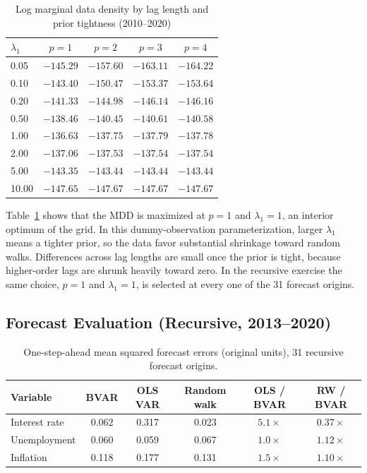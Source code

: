 \documentclass[11pt]{article}
\begin{document}
\begin{table}[H]
  \centering
  \caption{Log marginal data density by lag length and prior tightness (2010--2020)}
  \label{tab:mdd}
  \begin{tabular}{lcccc}
    \toprule
    $\lambda_1$ & $p=1$ & $p=2$ & $p=3$ & $p=4$ \\
    \midrule
    0.05 & $-145.29$ & $-157.60$ & $-163.11$ & $-164.22$ \\
    0.10 & $-143.40$ & $-150.47$ & $-153.37$ & $-153.64$ \\
    0.20 & $-141.33$ & $-144.98$ & $-146.14$ & $-146.16$ \\
    0.50 & $-138.46$ & $-140.45$ & $-140.61$ & $-140.58$ \\
    1.00 & $\mathbf{-136.63}$ & $-137.75$ & $-137.79$ & $-137.78$ \\
    2.00 & $-137.06$ & $-137.53$ & $-137.54$ & $-137.54$ \\
    5.00 & $-143.35$ & $-143.44$ & $-143.44$ & $-143.44$ \\
    10.00 & $-147.65$ & $-147.67$ & $-147.67$ & $-147.67$ \\
    \bottomrule
  \end{tabular}
\end{table}

Table~\ref{tab:mdd} shows that the MDD is maximized at $p = 1$ and $\lambda_1 = 1$, an interior optimum of the grid. In this dummy-observation parameterization, larger $\lambda_1$ means a tighter prior, so the data favor substantial shrinkage toward random walks. Differences across lag lengths are small once the prior is tight, because higher-order lags are shrunk heavily toward zero. In the recursive exercise the same choice, $p = 1$ and $\lambda_1 = 1$, is selected at every one of the 31 forecast origins.

\subsection{Forecast Evaluation (Recursive, 2013--2020)}

\begin{table}[H]
  \centering
  \caption{One-step-ahead mean squared forecast errors (original units), 31 recursive forecast origins.}
  \label{tab:forecast}
  \begin{tabular}{lccccc}
    \toprule
    Variable & BVAR & OLS VAR & Random walk & OLS / BVAR & RW / BVAR \\
    \midrule
    Interest rate & 0.062 & 0.317 & 0.023 & $5.1\times$ & $0.37\times$ \\
    Unemployment  & 0.060 & 0.059 & 0.067 & $1.0\times$ & $1.12\times$ \\
    Inflation     & 0.118 & 0.177 & 0.131 & $1.5\times$ & $1.10\times$ \\
    \bottomrule
  \end{tabular}
\end{table}
\end{document}
